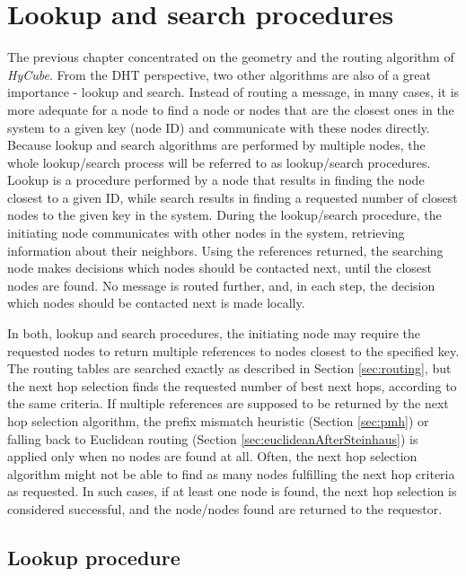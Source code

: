 \chapter{Lookup and search procedures}
\label{sec:lookupSearch}

The previous chapter concentrated on the geometry and the routing algorithm of \emph{HyCube}. From the DHT perspective, two other algorithms are also of a great importance - lookup and search. Instead of routing a message, in many cases, it is more adequate for a node to find a node or nodes that are the closest ones in the system to a given key (node ID) and communicate with these nodes directly. Because lookup and search algorithms are performed by multiple nodes, the whole lookup/search process will be referred to as lookup/search procedures. Lookup is a procedure performed by a node that results in finding the node closest to a given ID, while search results in finding a requested number of closest nodes to the given key in the system. During the lookup/search procedure, the initiating node communicates with other nodes in the system, retrieving information about their neighbors. Using the references returned, the searching node makes decisions which nodes should be contacted next, until the closest nodes are found. No message is routed further, and, in each step, the decision which nodes should be contacted next is made locally.

In both, lookup and search procedures, the initiating node may require the requested nodes to return multiple references to nodes closest to the specified key. The routing tables are searched exactly as described in Section \ref{sec:routing}, but the next hop selection finds the requested number of best next hops, according to the same criteria. If multiple references are supposed to be returned by the next hop selection algorithm, the prefix mismatch heuristic (Section \ref{sec:pmh}) or falling back to Euclidean routing (Section \ref{sec:euclideanAfterSteinhaus}) is applied only when no nodes are found at all. Often, the next hop selection algorithm might not be able to find as many nodes fulfilling the next hop criteria as requested. In such cases, if at least one node is found, the next hop selection is considered successful, and the node/nodes found are returned to the requestor.



\section{Lookup procedure}

